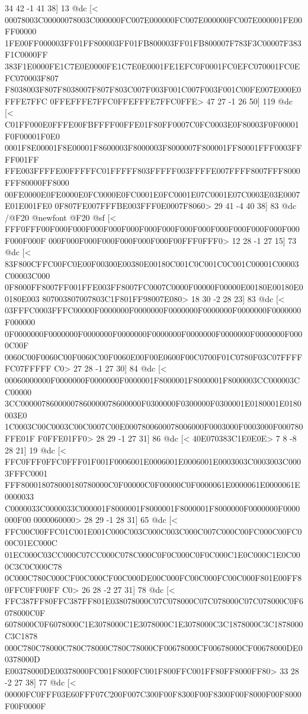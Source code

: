 	 34 42 -1 41 38] 13 @dc
[<
00078003C00000078003C000000FC007E000000FC007E000000FC007E000001FE00FF00000
1FE00FF000003FF01FF800003FF01FB800003FF01FB800007F783F3C00007F383F1C0000FF
383F1E0000FE1C7E0E0000FE1C7E0E0001FE1EFC0F0001FC0EFC070001FC0EFC070003F807
F8038003F807F8038007F807F803C007F003F001C007F003F001C00FE007E000E0FFFE7FFC
0FFEFFFE7FFC0FFEFFFE7FFC0FFE>
	 47 27 -1 26 50] 119 @dc
[<
C01FF000E0FFFE00FBFFFF00FFE01F80FF0007C0FC0003E0F80003F0F00001F0F00001F0E0
0001F8E00001F8E00001F8600003F8000003F8000007F800001FF80001FFF0003FFFF001FF
FFE003FFFFE00FFFFFC01FFFFF803FFFFF003FFFFE007FFFF8007FFF8000FFF80000FF8000
00FE0000E0FE0000E0FC0000E0FC0001E0FC0001E07C0001E07C0003E03E0007E01E001FE0
0F807FE007FFFBE003FFF0E0007F8060>
	 29 41 -4 40 38] 83 @dc
/@F20 @newfont
@F20 @sf
[<
FFF0FFF00F000F000F000F000F000F000F000F000F000F000F000F000F000F000F000F000F
000F000F000F000F000F000F000F00FFF0FFF0>
	 12 28 -1 27 15] 73 @dc
[<
83F800CFFC00FC0E00F00300E00380E00180C001C0C001C0C001C00001C00003C00003C000
0F8000FF8007FF001FFE003FF8007FC0007C0000F00000F00000E00180E00180E00180E003
807003807007803C1F801FF98007E080>
	 18 30 -2 28 23] 83 @dc
[<
03FFFC0003FFFC00000F0000000F0000000F0000000F0000000F0000000F0000000F000000
0F0000000F0000000F0000000F0000000F0000000F0000000F0000000F0000000F0000C00F
0060C00F0060C00F0060C00F0060E00F00E0600F00C0700F01C0780F03C07FFFFFC07FFFFF
C0>
	 27 28 -1 27 30] 84 @dc
[<
00060000000F0000000F0000000F0000001F8000001F8000001F8000003CC000003CC00000
3CC00000786000007860000078600000F0300000F0300000F0300001E0180001E0180003E0
1C0003C00C0003C00C0007C00E0007800600078006000F0003000F0003000F000780FFE01F
F0FFE01FF0>
	 28 29 -1 27 31] 86 @dc
[<
40E070383C1E0E0E>
	 7 8 -8 28 21] 19 @dc
[<
FFC0FFF0FFC0FFF01F001F0006001E0006001E0006001E0003003C0003003C0003FFFC0001
FFF800018078000180780000C0F00000C0F00000C0F0000061E0000061E0000061E0000033
C0000033C0000033C000001F8000001F8000001F8000001F8000000F0000000F0000000F00
0000060000>
	 28 29 -1 28 31] 65 @dc
[<
FFC00C00FFC01C001E001C000C003C000C003C000C007C000C00FC000C00FC000C01EC000C
01EC000C03CC000C07CC000C078C000C0F0C000C0F0C000C1E0C000C1E0C000C3C0C000C78
0C000C780C000CF00C000CF00C000DE00C000FC00C000FC00C000F801E00FF80FFC0FF00FF
C0>
	 26 28 -2 27 31] 78 @dc
[<
FFC387FF80FFC387FF801E038078000C07C078000C07C078000C07C078000C0F6078000C0F
6078000C0F6078000C1E3078000C1E3078000C1E3078000C3C1878000C3C1878000C3C1878
000C780C78000C780C78000C780C78000CF00678000CF00678000CF00678000DE00378000D
E00378000DE00378000FC001F8000FC001F800FFC001FF80FF8000FF80>
	 33 28 -2 27 38] 77 @dc
[<
00000FC0FFF03E60FFF07C200F007C300F00F8300F00F8300F00F8000F00F8000F00F0000F
